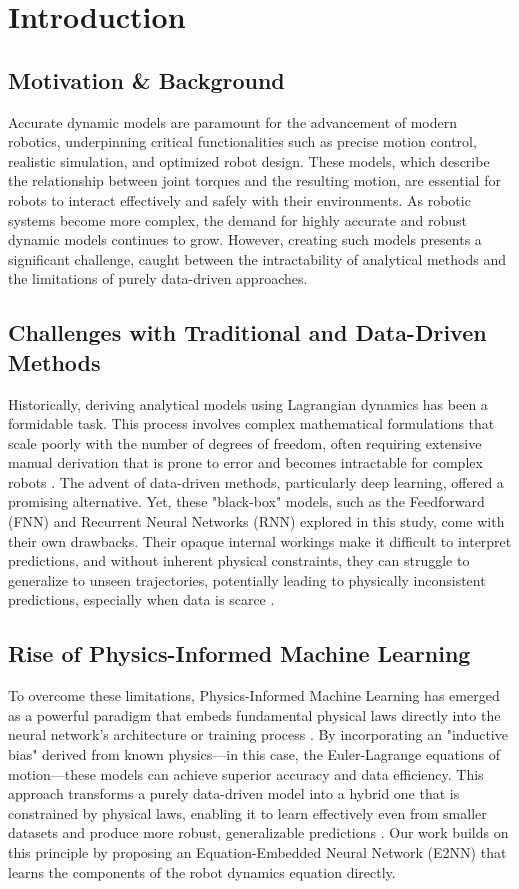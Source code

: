 \section{Introduction}

\subsection{Motivation \& Background}
Accurate dynamic models are paramount for the advancement of modern robotics, underpinning critical functionalities such as precise motion control, realistic simulation, and optimized robot design. These models, which describe the relationship between joint torques and the resulting motion, are essential for robots to interact effectively and safely with their environments. As robotic systems become more complex, the demand for highly accurate and robust dynamic models continues to grow. However, creating such models presents a significant challenge, caught between the intractability of analytical methods and the limitations of purely data-driven approaches.

\subsection{Challenges with Traditional and Data-Driven Methods}
Historically, deriving analytical models using Lagrangian dynamics has been a formidable task. This process involves complex mathematical formulations that scale poorly with the number of degrees of freedom, often requiring extensive manual derivation that is prone to error and becomes intractable for complex robots \cite{Li2025}. The advent of data-driven methods, particularly deep learning, offered a promising alternative. Yet, these "black-box" models, such as the Feedforward (FNN) and Recurrent Neural Networks (RNN) explored in this study, come with their own drawbacks. Their opaque internal workings make it difficult to interpret predictions, and without inherent physical constraints, they can struggle to generalize to unseen trajectories, potentially leading to physically inconsistent predictions, especially when data is scarce \cite{Giacomuzzo2024}.

\subsection{Rise of Physics-Informed Machine Learning}
To overcome these limitations, Physics-Informed Machine Learning has emerged as a powerful paradigm that embeds fundamental physical laws directly into the neural network's architecture or training process \cite{Liu2024}. By incorporating an "inductive bias" derived from known physics—in this case, the Euler-Lagrange equations of motion—these models can achieve superior accuracy and data efficiency. This approach transforms a purely data-driven model into a hybrid one that is constrained by physical laws, enabling it to learn effectively even from smaller datasets and produce more robust, generalizable predictions \cite{Deng2024, Yang2023}. Our work builds on this principle by proposing an Equation-Embedded Neural Network (E2NN) that learns the components of the robot dynamics equation directly.

